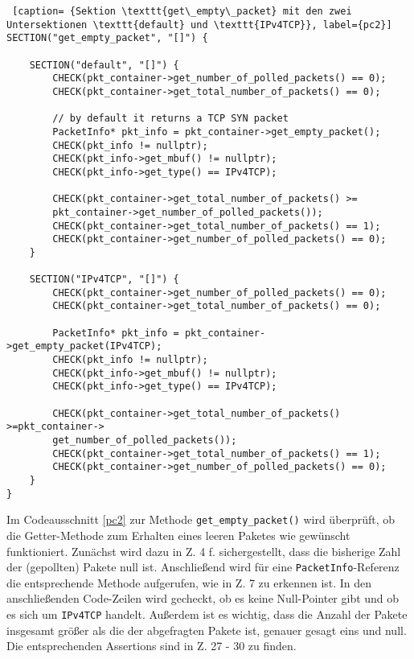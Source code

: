 \documentclass[../review_3.tex]{subfiles}
\begin{document}
\begin{lstlisting} [caption= {Sektion \texttt{get\_empty\_packet} mit den zwei Untersektionen \texttt{default} und \texttt{IPv4TCP}}, label={pc2}]
SECTION("get_empty_packet", "[]") {
        
    SECTION("default", "[]") {
        CHECK(pkt_container->get_number_of_polled_packets() == 0);
        CHECK(pkt_container->get_total_number_of_packets() == 0);
        
        // by default it returns a TCP SYN packet    
        PacketInfo* pkt_info = pkt_container->get_empty_packet();
        CHECK(pkt_info != nullptr);
        CHECK(pkt_info->get_mbuf() != nullptr);
        CHECK(pkt_info->get_type() == IPv4TCP);
            
        CHECK(pkt_container->get_total_number_of_packets() >=
        pkt_container->get_number_of_polled_packets());
        CHECK(pkt_container->get_total_number_of_packets() == 1);
        CHECK(pkt_container->get_number_of_polled_packets() == 0);
    }
        
    SECTION("IPv4TCP", "[]") {
        CHECK(pkt_container->get_number_of_polled_packets() == 0);
        CHECK(pkt_container->get_total_number_of_packets() == 0);
           
        PacketInfo* pkt_info = pkt_container->get_empty_packet(IPv4TCP);
        CHECK(pkt_info != nullptr);
        CHECK(pkt_info->get_mbuf() != nullptr);
        CHECK(pkt_info->get_type() == IPv4TCP);
            
        CHECK(pkt_container->get_total_number_of_packets() >=pkt_container->                   
        get_number_of_polled_packets());       
        CHECK(pkt_container->get_total_number_of_packets() == 1);
        CHECK(pkt_container->get_number_of_polled_packets() == 0);
    }
}\end{lstlisting}

Im Codeausschnitt \ref{pc2} zur Methode \texttt{get\_empty\_packet()} wird überprüft, ob die Getter-Methode zum Erhalten eines leeren Paketes wie gewünscht funktioniert. Zunächst wird dazu in Z. 4 f. sichergestellt, dass die bisherige Zahl der (gepollten) Pakete null ist. Anschließend wird für eine \texttt{PacketInfo}-Referenz die entsprechende Methode aufgerufen, wie in Z. 7 zu erkennen ist. In den anschließenden Code-Zeilen wird gecheckt, ob es keine Null-Pointer gibt und ob es sich um \texttt{IPv4TCP} handelt. Außerdem ist es wichtig, dass die Anzahl der Pakete insgesamt größer als die der abgefragten Pakete ist, genauer gesagt eins und null. Die entsprechenden Assertions sind in Z. 27 - 30 zu finden.
\end{document}

